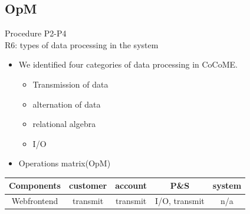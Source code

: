 \documentclass[18pt]{beamer}
\newcommand{\kmark}{\ding{108}}
\begin{document}
\subsection{OpM}
\begin{frame}{Procedure P2-P4\\ R6: types of data processing in the system \kmark}
\begin{itemize}
\item We identified four categories of data processing in CoCoME.
\begin{itemize}
\item Transmission of data
\item alternation of data
\item relational algebra
\item I/O
\end{itemize}
\pause
\item Operations matrix(OpM)
\end{itemize}
\begin{tabular}{|c|c|c|c|c|}
\hline 
 Components & customer & account & P\&S & system \\ 
\hline 
Webfrontend & transmit & transmit & I/O, transmit & n/a \\ 
\hline 
\end{tabular} 
\end{frame}
\end{document}
